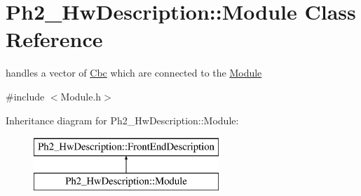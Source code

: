 \hypertarget{class_ph2___hw_description_1_1_module}{\section{Ph2\-\_\-\-Hw\-Description\-:\-:Module Class Reference}
\label{class_ph2___hw_description_1_1_module}
}


handles a vector of \hyperlink{class_ph2___hw_description_1_1_cbc}{Cbc} which are connected to the \hyperlink{class_ph2___hw_description_1_1_module}{Module}  




{\ttfamily \#include $<$Module.\-h$>$}

Inheritance diagram for Ph2\-\_\-\-Hw\-Description\-:\-:Module\-:\begin{figure}[H]
\begin{center}
\leavevmode
\includegraphics[height=2.000000cm]{class_ph2___hw_description_1_1_module}
\end{center}
\end{figure}
